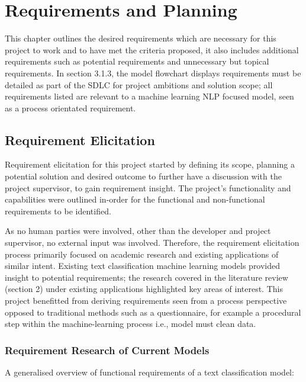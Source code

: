 \chapter{Requirements and Planning}

This chapter outlines the desired requirements which are necessary for this project to work and to have met the criteria proposed, it also includes additional requirements such as potential requirements and unnecessary but topical requirements. In section 3.1.3, the model flowchart displays requirements must be detailed as part of the SDLC for project ambitions and solution scope; all requirements listed are relevant to a machine learning NLP focused model, seen as a process orientated requirement.

\section{Requirement Elicitation}

Requirement elicitation for this project started by defining its scope, planning a potential solution and desired outcome to further have a discussion with the project supervisor, to gain requirement insight. The project’s functionality and capabilities were outlined in-order for the functional and non-functional requirements to be identified.

As no human parties were involved, other than the developer and project supervisor, no external input was involved. Therefore, the requirement elicitation process primarily focused on academic research and existing applications of similar intent. Existing text classification machine learning models provided insight to potential requirements; the research covered in the literature review (section 2) under existing applications highlighted key areas of interest. This project benefitted from deriving requirements seen from a process perspective opposed to traditional methods such as a questionnaire, for example a procedural step within the machine-learning process i.e., model must clean data.

\subsection{Requirement Research of Current Models}

A generalised overview of functional requirements of a text classification model:


